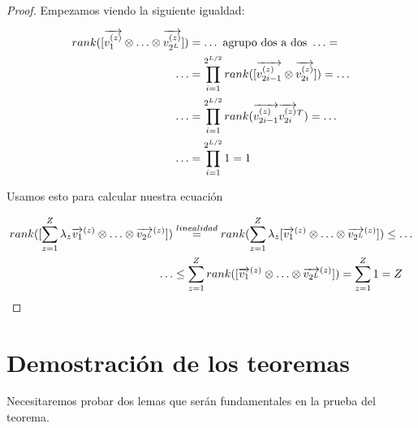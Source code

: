 \begin{proof}

    Empezamos viendo la siguiente igualdad:

    \begin{equation}
    \begin{split}
        rank([\nv{v_1^{(z)}}  \otimes \ldots \otimes \nv{v_{2^L}^{(z)}}]) &= \ldots \text{  agrupo dos a dos   } \ldots = \\
        \ldots &= \prod_{i = 1}^{2^{L/2}} rank([\nv{v_{2i - 1}^{(z)}} \otimes\nv{v_{2i}^{(z)}}]) = \ldots   \\
        \ldots &= \prod_{i = 1}^{2^{L/2}} rank(\nv{v_{2i - 1}^{(z)}} \nv{v_{2i}^{(z)}}^T) = \ldots \\
        \ldots &= \prod_{i = 1}^{2^{L/2}} 1 = 1
    \end{split}
    \end{equation}

    Usamos esto para calcular nuestra ecuación

    \begin{equation}
    \begin{split}
        rank([\sum_{z = 1}^Z \lambda_z \nv{v_1}^{(z)} \otimes \ldots \otimes \nv{v_{2^L}}^{(z)}]) &\encima{=}{linealidad} rank(\sum_{z = 1}^Z \lambda_z [\nv{v_1}^{(z)} \otimes \ldots \otimes \nv{v_{2^L}}^{(z)}]) \leq \ldots \\
        \ldots &\leq \sum_{z = 1}^Z rank([\nv{v_1}^{(z)} \otimes \ldots \otimes \nv{v_{2^L}}^{(z)}]) = \sum_{z = 1}^Z 1 = Z
    \end{split}
    \end{equation}
\end{proof}

\section{Demostración de los teoremas}

Necesitaremos probar dos lemas que serán fundamentales en la prueba del teorema.

